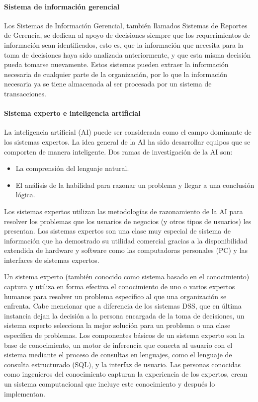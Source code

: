 \paragraph{Sistema de información gerencial}

Los Sistemas de Información Gerencial, también llamados Sistemas de Reportes de Gerencia, se dedican al apoyo de decisiones siempre que los requerimientos de información sean identificados, esto es, que la información que necesita para la toma de decisiones haya sido analizada anteriormente, y que esta misma decisión pueda tomarse nuevamente\cite{kendall2005analisis}. Estos sistemas pueden extraer la información necesaria de cualquier parte de la organización, por lo que la información necesaria ya se tiene almacenada al ser procesada por un sistema de transacciones. 


\paragraph{Sistema experto e inteligencia artificial }

La inteligencia artificial (AI) puede ser considerada como el campo dominante de los sistemas expertos. La idea general de la AI ha sido desarrollar equipos que se comporten de manera inteligente\cite{kendall2005analisis}. Dos ramas de investigación de la AI son: 

\begin{itemize}

\item La comprensión del lenguaje natural. 
\item El análisis de la habilidad para razonar un problema y llegar a una conclusión lógica. 

\end{itemize}

Los sistemas expertos utilizan las metodologías de razonamiento de la AI para resolver los problemas que los usuarios de negocios (y otros tipos de usuarios) les presentan. Los sistemas expertos son una clase muy especial de sistema de información que ha demostrado su utilidad comercial gracias a la disponibilidad extendida de hardware y software como las computadoras personales (PC) y las interfaces de sistemas expertos.


Un sistema experto (también conocido como sistema basado en el conocimiento) captura y utiliza en forma efectiva el conocimiento de uno o varios expertos humanos para resolver un problema específico al que una organización se enfrenta. Cabe mencionar que a diferencia de los sistemas DSS, que en última instancia dejan la decisión a la persona encargada de la toma de decisiones, un sistema experto selecciona la mejor solución para un problema o una clase específica de problemas. Los componentes básicos de un sistema experto son la base de conocimiento, un motor de inferencia que conecta al usuario con el sistema mediante el proceso de consultas en lenguajes, como el lenguaje de consulta estructurado (SQL), y la interfaz de usuario. Las personas conocidas como ingenieros del conocimiento capturan la experiencia de los expertos, crean un sistema computacional que incluye este conocimiento y después lo implementan.

